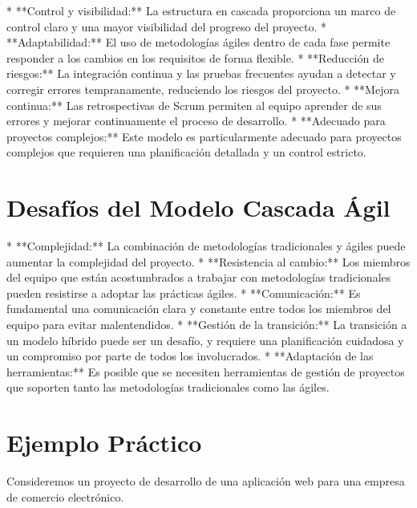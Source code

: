 \documentclass[12pt, spanish]{article}
\begin{document}
*   **Control y visibilidad:** La estructura en cascada proporciona un marco de control claro y una mayor visibilidad del progreso del proyecto.
*   **Adaptabilidad:** El uso de metodologías ágiles dentro de cada fase permite responder a los cambios en los requisitos de forma flexible.
*   **Reducción de riesgos:** La integración continua y las pruebas frecuentes ayudan a detectar y corregir errores tempranamente, reduciendo los riesgos del proyecto.
*   **Mejora continua:** Las retrospectivas de Scrum permiten al equipo aprender de sus errores y mejorar continuamente el proceso de desarrollo.
*   **Adecuado para proyectos complejos:** Este modelo es particularmente adecuado para proyectos complejos que requieren una planificación detallada y un control estricto.

\section*{Desafíos del Modelo Cascada Ágil}

*   **Complejidad:** La combinación de metodologías tradicionales y ágiles puede aumentar la complejidad del proyecto.
*   **Resistencia al cambio:**  Los miembros del equipo que están acostumbrados a trabajar con metodologías tradicionales pueden resistirse a adoptar las prácticas ágiles.
*   **Comunicación:**  Es fundamental una comunicación clara y constante entre todos los miembros del equipo para evitar malentendidos.
*   **Gestión de la transición:** La transición a un modelo híbrido puede ser un desafío, y requiere una planificación cuidadosa y un compromiso por parte de todos los involucrados.
*   **Adaptación de las herramientas:**  Es posible que se necesiten herramientas de gestión de proyectos que soporten tanto las metodologías tradicionales como las ágiles.

\section*{Ejemplo Práctico}

Consideremos un proyecto de desarrollo de una aplicación web para una empresa de comercio electrónico.
\end{document}
